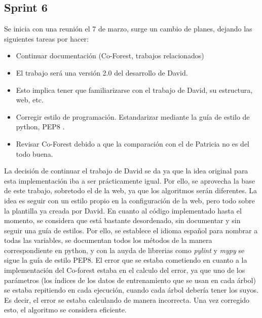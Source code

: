 \subsection{Sprint 6}
Se inicia con una reunión el 7 de marzo, surge un cambio de planes, dejando las siguientes tareas por hacer:
\begin{itemize}
	\item Continuar documentación (Co-Forest, trabajos relacionados)
	\item El trabajo será una versión 2.0 del desarrollo de David.
	\item Esto implica tener que familiarizarse con el trabajo de David, su estructura, web, etc.
	\item Corregir estilo de programación. Estandarizar mediante la guía de estilo de python, PEP8 \cite{PEP8}.
	\item Revisar Co-Forest debido a que la comparación con el de Patricia no es del todo buena.
	
\end{itemize} 
La decisión de continuar el trabajo de David se da ya que la idea original para esta implementación iba a ser prácticamente igual. Por ello, se aprovecha la base de este trabajo, sobretodo el de la web, ya que los algoritmos serán diferentes. La idea es seguir con un estilo propio en la configuración de la web, pero todo sobre la plantilla ya creada por David. 
En cuanto al código implementado hasta el momento, se considera que está bastante desordenado, sin documentar y sin seguir una guía de estilos. Por ello, se establece el idioma español para nombrar a todas las variables, se documentan todos los métodos de la manera correspondiente en python, y con la auyda de librerias como \textit{pylint} y \textit{mypy} se sigue la guía de estilo PEP8.
El error que se estaba cometiendo en cuanto a la implementación del Co-forest estaba en el calculo del error, ya que uno de los parámetros (los índices de los datos de entrenamiento que se usan en cada árbol) se estaba repitiendo en cada ejecución, cuando cada árbol debería tener los suyos. Es decir, el error se estaba calculando de manera incorrecta. Una vez corregido esto, el algoritmo se considera eficiente.

